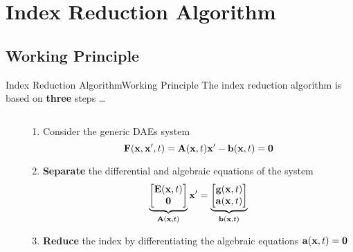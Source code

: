 
\section{Index Reduction Algorithm}

\subsection{Working Principle}

\begin{frame}{Index Reduction Algorithm}{Working Principle}
  The index reduction algorithm is based on \textbf{three} steps \dots
  \begin{columns}
    \begin{column}[c]{0.2\textwidth}
      \flushright
      \vspace{-1.25em}%
    \end{column}
    \begin{column}[c]{0.85\textwidth}
      \begin{enumerate}[<+->]
        \item Consider the generic \acsp{DAE} system
        \begin{equation*}
          \mathbf{F}(\mathbf{x}, \mathbf{x}^\prime, t) = \mathbf{A}(\mathbf{x}, t) \mathbf{x}^\prime - \mathbf{b}(\mathbf{x}, t) = \mathbf{0}
        \end{equation*}
        \item \textbf{Separate} the differential and algebraic equations of the system
        \begin{equation*}
          \underbrace{\begin{bmatrix} \mathbf{E}(\mathbf{x}, t) \\ \mathbf{0} \end{bmatrix}}_{\mathbf{A}(\mathbf{x}, t)} \mathbf{x}^\prime = \underbrace{\begin{bmatrix} \mathbf{g}(\mathbf{x}, t) \\ \mathbf{a}(\mathbf{x}, t) \end{bmatrix}}_{\mathbf{b}(\mathbf{x}, t)}
        \end{equation*}
        \item \textbf{Reduce} the index by differentiating the algebraic equations $\mathbf{a}(\mathbf{x}, t) = \mathbf{0}$
      \end{enumerate}
    \end{column}
  \end{columns}
  \vspace{0.75em}
\end{frame}


